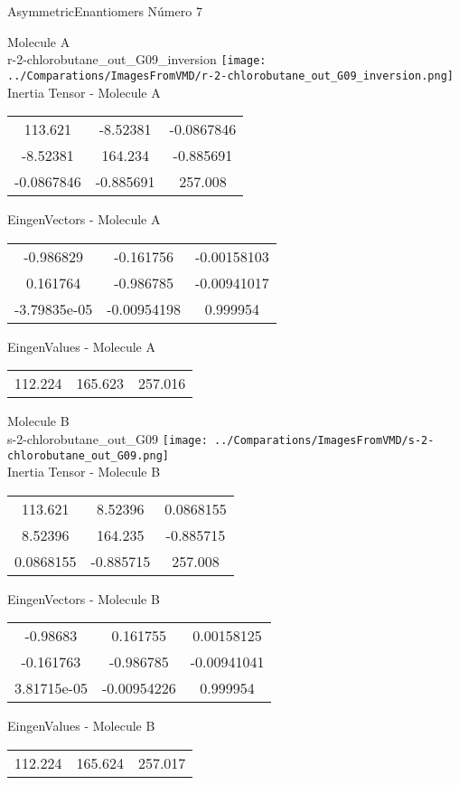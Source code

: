 \vtab[-2cm]
\begin{center}
{\large AsymmetricEnantiomers \tab Número 7}
\end{center}
\begin{multicols}{2}
\begin{center}

Molecule A \\ 
r-2-chlorobutane\_out\_G09\_inversion
\texttt{[image: ../Comparations/ImagesFromVMD/r-2-chlorobutane\_out\_G09\_inversion.png]}
\\
Inertia Tensor - Molecule A \\
\vtab

\begin{tabular}{|c c c|}
113.621	 & 	-8.52381	 & 	-0.0867846	 \\
-8.52381	 & 	164.234	 & 	-0.885691	 \\
-0.0867846	 & 	-0.885691	 & 	257.008
\end{tabular}

\vtab
 EingenVectors - Molecule A     \\
\vtab
\begin{tabular}{|c c c|}
-0.986829	 & 	-0.161756	 & 	-0.00158103	 \\
0.161764	 & 	-0.986785	 & 	-0.00941017	 \\
-3.79835e-05	 & 	-0.00954198	 & 	0.999954
\end{tabular}

\vtab
 EingenValues - Molecule A     \\
\vtab
\begin{tabular}{|c c c|}
112.224	 & 	165.623	 & 	257.016	 \\
\end{tabular}
\columnbreak

Molecule B \\ 
s-2-chlorobutane\_out\_G09
\texttt{[image: ../Comparations/ImagesFromVMD/s-2-chlorobutane\_out\_G09.png]}
\\
Inertia Tensor - Molecule B \\
\vtab

\begin{tabular}{|c c c|}
113.621	 & 	8.52396	 & 	0.0868155	 \\
8.52396	 & 	164.235	 & 	-0.885715	 \\
0.0868155	 & 	-0.885715	 & 	257.008
\end{tabular}

\vtab
 EingenVectors - Molecule B     \\
\vtab
\begin{tabular}{|c c c|}
-0.98683	 & 	0.161755	 & 	0.00158125	 \\
-0.161763	 & 	-0.986785	 & 	-0.00941041	 \\
3.81715e-05	 & 	-0.00954226	 & 	0.999954
\end{tabular}

\vtab
 EingenValues - Molecule B     \\
\vtab
\begin{tabular}{|c c c|}
112.224	 & 	165.624	 & 	257.017	 \\
\end{tabular}

\end{center}
\end{multicols}
